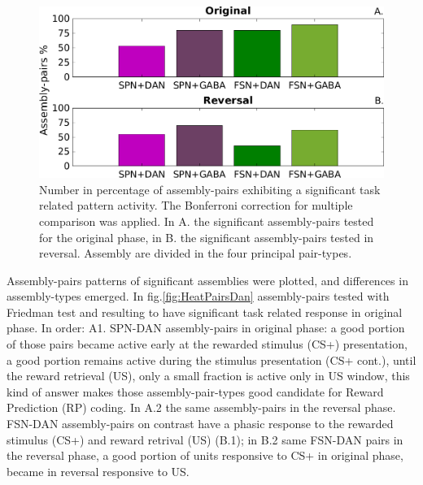 \begin{figure}
    \centering
    \includegraphics[scale=0.55]{figures/PercFriedHitTrialsBFf.png}
    \caption{Number in percentage of assembly-pairs exhibiting a significant task related pattern activity. The Bonferroni correction for multiple comparison was applied. In A. the significant assembly-pairs tested for the original phase, in B. the significant assembly-pairs tested in reversal. Assembly are divided in the four principal pair-types.}
    \label{fig:PercAsFried}
\end{figure}
Assembly-pairs patterns of significant assemblies were plotted, and differences in assembly-types emerged. In fig.\ref{fig:HeatPairsDan} assembly-pairs tested with Friedman test and resulting to have significant task related response in original phase. In order: A1. SPN-DAN assembly-pairs in original phase: a good portion of those pairs became active early at the rewarded stimulus (CS+) presentation, a good portion remains active during the stimulus presentation (CS+ cont.), until the reward retrieval (US), only a small fraction is active only in US window, this kind of answer makes those assembly-pair-types good candidate for Reward Prediction (RP) coding. In A.2 the same assembly-pairs in the reversal phase. FSN-DAN assembly-pairs on contrast have a phasic response to the rewarded stimulus (CS+) and reward retrival (US) (B.1); in B.2 same FSN-DAN pairs in the reversal phase, a good portion of units responsive to CS+ in original phase, became in reversal responsive to US.\\ %
